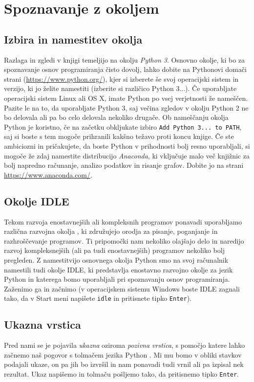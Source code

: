 \chapter{Spoznavanje z okoljem}

\section{Izbira in namestitev okolja}
Razlaga in zgledi v knjigi temeljijo na okolju \emph{Python 3}. Osnovno okolje, ki bo za spoznavanje osnov programiranja čisto dovolj, lahko dobite na Pythonovi domači strani (\url{https://www.python.org/}), kjer si izberete še svoj operacijski sistem in verzijo, ki jo želite namestiti (izberite si različico Python 3...). Če uporabljate operacijski sistem Linux ali OS X, imate Python po vsej verjetnosti že nameščen. Pazite le na to, da uporabljate Python 3, saj večina zgledov v okolju Python 2 ne bo delovala ali pa bo celo delovala nekoliko drugače. Ob nameščanju okolja Python je koristno, če na začetku obkljukate izbiro \texttt{Add Python 3... to PATH}, saj si boste s tem mogoče prihranili kakšno težavo proti koncu knjige. Če ste ambiciozni in pričakujete, da boste Python v prihodnosti bolj resno uporabljali, si mogoče že zdaj namestite distribucijo \emph{Anaconda}, ki vključuje malo več knjižnic za bolj napredno računanje, analizo podatkov in risanje grafov. Dobite jo na strani \url{https://www.anaconda.com/}.

\section{Okolje IDLE}

Tekom razvoja enostavnejših ali kompleksnih programov ponavadi uporabljamo različna razvojna okolja , ki združujejo orodja za pisanje, poganjanje in razhroščevanje  programov. Ti pripomočki nam nekoliko olajšajo delo in naredijo razvoj kompleksnejših (ali pa tudi enostavnejših) programov nekoliko bolj pregleden. Z namestitvijo osnovnega okolja Python smo na svoj računalnik namestili tudi okolje IDLE, ki predstavlja enostavno razvojno okolje za jezik Python in katerega bomo uporabljali pri spoznavanju osnov programiranja. Zaženimo ga in začnimo (v operacijskem sistemu Windows boste IDLE zagnali tako, da v Start meni napišete \texttt{idle} in pritisnete tipko \texttt{Enter}).

\section{Ukazna vrstica}
Pred nami se je pojavila \emph{ukazna} oziroma \emph{pozivna vrstica}, s pomočjo katere lahko začnemo naš pogovor s tolmačem jezika Python . Mi mu bomo v obliki stavkov podajali ukaze, on pa jih bo izvršil in nam ponavadi tudi vrnil ali pa izpisal nek rezultat. Ukaz napišemo in tolmaču pošljemo tako, da pritisnemo tipko \texttt{Enter}. 

